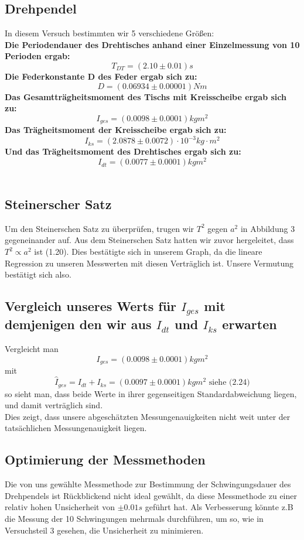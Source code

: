 \documentclass[11pt,a4paper]{article}
\begin{document}
	\subsection{Drehpendel}
	In diesem Versuch bestimmten wir 5 verschiedene Größen:\\
	{\bf Die Periodendauer des Drehtisches anhand einer Einzelmessung von 10 Perioden ergab:}
	$$T_{DT}=(2.10\pm 0.01)s$$
	{\bf Die Federkonstante D des Feder ergab sich zu:}
	$$D=(0.06934 \pm 0.00001) Nm $$
	{\bf Das Gesamtträgheitsmoment des Tischs mit Kreisscheibe ergab sich zu:}
	$$I_{ges}=(0.0098 \pm 0.0001)kgm^2$$
	{\bf Das Trägheitsmoment der Kreisscheibe ergab sich zu:}
	$$	I_{ks}=(2.0878 \pm 0.0072)\cdot 10^{-3} kg \cdot m^2$$
	{\bf Und das Trägheitsmoment des Drehtisches ergab sich zu:}
	$$	I_{dt}=(0.0077 \pm 0.0001)kgm^2 $$
	\\
	\subsection{Steinerscher Satz}
	Um den Steinerschen Satz zu überprüfen, trugen wir $T^2$ gegen $a^2$ in Abbildung 3 gegeneinander auf.
	Aus dem Steinerschen Satz hatten wir zuvor hergeleitet, dass $T^2 \propto a^2$ ist (1.20).
	Dies bestätigte sich in unserem Graph, da die lineare Regression zu unseren Messwerten mit diesen Verträglich ist.
	Unsere Vermutung bestätigt sich also.
	\subsection{Vergleich unseres Werts für $I_{ges}$ mit demjenigen den wir aus $I_{dt}$ und $I_{ks}$ erwarten}
	Vergleicht man $$I_{ges}=(0.0098 \pm 0.0001)kgm^2$$
	mit $$\hat{I}_{ges}=I_{dt}+I_{ks}=(0.0097 \pm 0.0001)kgm^2 \text{ siehe (2.24)}$$
	so sieht man, dass beide Werte in ihrer gegenseitigen Standardabweichung liegen, und damit verträglich sind. \\
	Dies zeigt, dass unsere abgeschätzten Messungenauigkeiten nicht weit unter der tatsächlichen Messungenauigkeit liegen.

	\subsection{Optimierung der Messmethoden}
	Die von uns gewählte Messmethode zur Bestimmung der Schwingungsdauer des Drehpendels ist Rückblickend nicht ideal gewählt, da diese Messmethode zu einer relativ hohen Unsicherheit von $\pm 0.01s$ geführt hat.
	Als Verbesserung könnte z.B die Messung der 10 Schwingungen mehrmals durchführen, um so, wie in Versuchsteil 3 gesehen, die Unsicherheit zu minimieren.
\end{document}
